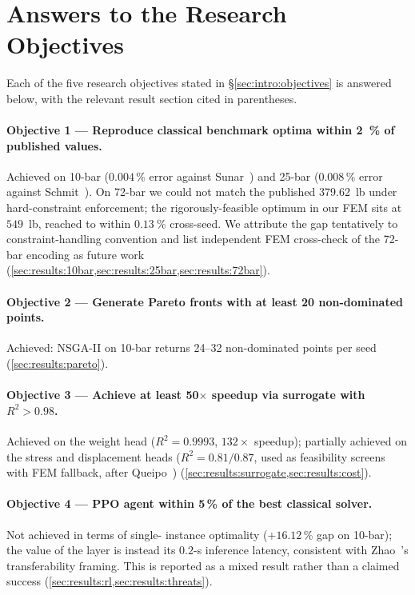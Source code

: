 \section{Answers to the Research Objectives}
\label{sec:concl:objectives}

Each of the five research objectives stated in
\S\ref{sec:intro:objectives} is answered below, with the
relevant result section cited in parentheses.

\paragraph{Objective 1 --- Reproduce classical benchmark
optima within \num{2}~\% of published values.} Achieved on
10-bar ($\num{0.004}\,\%$ error against Sunar~\cite{sunar1991})
and 25-bar ($\num{0.008}\,\%$ error against
Schmit~\cite{schmit1976}). On 72-bar we could not match the
published \num{379.62}~lb under hard-constraint enforcement;
the rigorously-feasible optimum in our FEM sits at
$\num{549}$~lb, reached to within $\num{0.13}~\%$ cross-seed.
We attribute the gap tentatively to constraint-handling
convention and list independent FEM cross-check of the 72-bar
encoding as future work
(\cref{sec:results:10bar,sec:results:25bar,sec:results:72bar}).

\paragraph{Objective 2 --- Generate Pareto fronts with at
least 20 non-dominated points.} Achieved: NSGA-II on 10-bar
returns \num{24}--\num{32} non-dominated points per seed
(\cref{sec:results:pareto}).

\paragraph{Objective 3 --- Achieve at least \num{50}$\times$
speedup via surrogate with $R^2 > \num{0.98}$.} Achieved
on the weight head ($R^2=\num{0.9993}$, $\num{132}\times$
speedup); partially achieved on the stress and displacement
heads ($R^2 = \num{0.81}/\num{0.87}$, used as feasibility
screens with FEM fallback, after
Queipo~\cite{queipo2005})
(\cref{sec:results:surrogate,sec:results:cost}).

\paragraph{Objective 4 --- PPO agent within \num{5}\,\% of the
best classical solver.} Not achieved in terms of single-
instance optimality ($+\num{16.12}\,\%$ gap on 10-bar); the
value of the layer is instead its $\num{0.2}$-s inference
latency, consistent with Zhao~\cite{zhao2021rl}'s
transferability framing. This is reported as a mixed result
rather than a claimed success
(\cref{sec:results:rl,sec:results:threats}).

